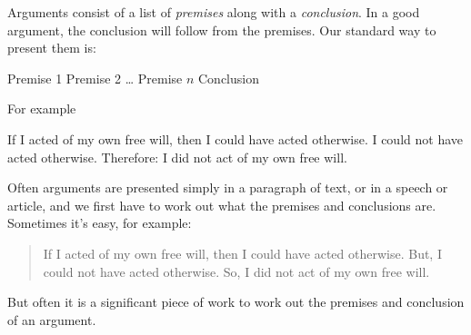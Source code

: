 Arguments consist of a list of \emph{premises} along with a \emph{conclusion}. In a good argument, the conclusion will follow from the premises.
Our standard way to present them is:
\begin{earg}
\prem Premise 1
\prem Premise 2
\prem \dots
\prem Premise $n$
\conc Conclusion
\end{earg}
For	example
	\begin{earg}
	\prem If I acted of my own free will, then I could have acted otherwise.
	\prem I could not have acted otherwise.
	\conc Therefore: I did not act of my own free will.
	\end{earg}


Often arguments are presented simply in a paragraph of text, or in a speech or article, and we first have to work out what the premises and conclusions are.
Sometimes it's easy, for example:
\begin{quote}
	If I acted of my own free will, then I could have acted otherwise.
	But, I could not have acted otherwise.
	So, I did not act of my own free will.
\end{quote}
But often it is a significant piece of work to work out the premises and conclusion of an argument.





